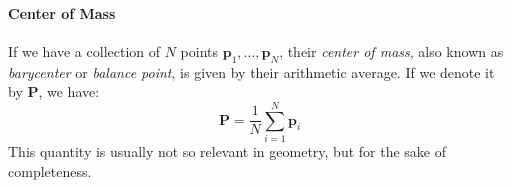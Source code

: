 \paragraph{Center of Mass}
If we have a collection of $N$ points $\mathbf{p}_1, \ldots, \mathbf{p}_N$, their \emph{center of mass}, also known as \emph{barycenter} or \emph{balance point}, is given by their arithmetic average. If we denote it by $\mathbf{P}$, we have:
\begin{equation}
\mathbf{P} = \frac{1}{N} \sum_{i = 1}^N \mathbf{p}_i
\end{equation}
This quantity is usually not so relevant in geometry, but for the sake of completeness.







